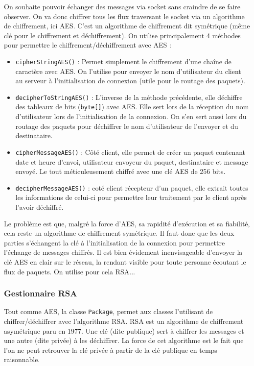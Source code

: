 \documentclass{article}
\begin{document}
On souhaite pouvoir échanger des messages via socket sans craindre de se faire observer. On va donc chiffrer tous les flux 
traversant le socket via un algorithme de chiffrement, ici AES. 
C'est un algorithme de chiffrement dit symétrique (même clé pour le chiffrement et déchiffrement). 
On utilise principalement 4 méthodes pour permettre le chiffrement/déchiffrement avec AES : 
\begin{itemize}
    \item \texttt{cipherStringAES()} : Permet simplement le chiffrement d'une chaîne de caractère avec AES. 
    On l'utilise pour envoyer le nom d'utilisateur du client au serveur à l'initialisation de connexion (utile pour le routage des paquets). 
    \item \texttt{decipherToStringAES()} : L'inverse de la méthode précédente, elle déchiffre des tableaux de bits (\texttt{byte[]}) 
    avec AES. Elle sert lors de la réception du nom d'utilisateur lors de l'initialisation de la connexion.
    On s'en sert aussi lors du routage des paquets pour déchiffrer le nom d'utilisateur de l'envoyer et du destinataire. 
    \item \texttt{cipherMessageAES()} : Côté client, elle permet de créer un paquet contenant date et heure d'envoi, utilisateur 
    envoyeur du paquet, destinataire et message envoyé. Le tout méticuleusement chiffré avec une clé AES de 256 bits. 
    \item \texttt{decipherMessageAES()} : coté client récepteur d'un paquet, elle extrait toutes les informations de celui-ci pour 
    permettre leur traitement par le client après l'avoir déchiffré. 
\end{itemize}

Le problème est que, malgré la force d'AES, sa rapidité d'exécution et sa fiabilité, cela reste un algorithme de chiffrement symétrique. 
Il faut donc que les deux parties s'échangent la clé à l'initialisation de la connexion pour permettre l'échange de messages chiffrés. 
Il est bien évidement inenvisageable d'envoyer la clé AES en clair sur le réseau, la rendant visible pour toute personne écoutant le flux de paquets. 
On utilise pour cela RSA...

\subsubsection{Gestionnaire RSA}

Tout comme AES, la classe \texttt{Package}, permet aux classes l'utilisant de chiffrer/déchiffrer avec l'algorithme RSA. 
RSA est un algorithme de chiffrement asymétrique paru en 1977. Une clé (dite publique) sert à chiffrer les messages et une autre (dite privée) à les déchiffrer. 
La force de cet algorithme est le fait que l'on ne peut retrouver la clé privée à partir de la clé publique en temps raisonnable. 
\end{document}

